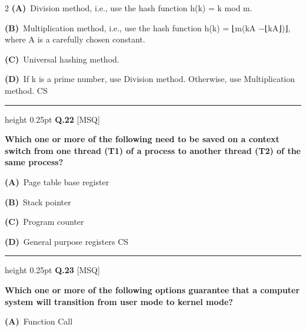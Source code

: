 \documentclass[a4paper,10pt,twoside]{article}
\begin{document}
\begin{multicols}{2}
\textbf{(A)}~Division method, i.e., use the hash function h(k) = k mod m.\par\vspace{2pt}\noindent
\textbf{(B)}~Multiplication method, i.e., use the hash function h(k) = ⌊m(kA −⌊kA⌋)⌋, where \newline A is a carefully chosen constant.\par\vspace{2pt}\noindent
\textbf{(C)}~Universal hashing method.\par\vspace{2pt}\noindent
\textbf{(D)}~If k is a prime number, use Division method. Otherwise, use Multiplication method. \newline CS
\par\vspace{6pt}\hrule height 0.25pt\vspace{6pt}
\noindent\textbf{Q.22} \hfill {\footnotesize\textsf{[MSQ]}}
\par\vspace{2pt}
{\bfseries Which one or more of the following need to be saved on a context switch from one
thread (T1) of a process to another thread (T2) of the same process? \par}
\par\vspace{2pt}\noindent
\textbf{(A)}~Page table base register\par\vspace{2pt}\noindent
\textbf{(B)}~Stack pointer\par\vspace{2pt}\noindent
\textbf{(C)}~Program counter\par\vspace{2pt}\noindent
\textbf{(D)}~General purpose registers \newline CS
\par\vspace{6pt}\hrule height 0.25pt\vspace{6pt}
\noindent\textbf{Q.23} \hfill {\footnotesize\textsf{[MSQ]}}
\par\vspace{2pt}
{\bfseries Which one or more of the following options guarantee that a computer system will
transition from user mode to kernel mode? \par}
\par\vspace{2pt}\noindent
\textbf{(A)}~Function Call\par\vspace{2pt}\noindent

\end{multicols}
\end{document}
